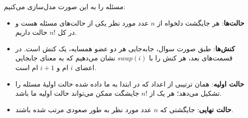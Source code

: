 \question{}
\begin{ابجد}
\item مسئله را به این صورت مدل‌سازی می‌کنیم:
\begin{itemize}
    \item \textbf{حالت‌ها}: هر جایگشت دلخواه از $n$ عدد مورد نظر یکی از حالت‌های مسئله هست و در کل $n!$ حالت داریم.
    \item \textbf{کنش‌ها}: طبق صورت سوال، جابه‌جایی هر دو عضو همسایه، یک کنش است. در قسمت‌های بعد، هر کنش را با $swap(i)$ نشان می‌دهیم که به معنای جابجایی اعضای $i$ ام و $i+1$ ام است.
    \item \textbf{حالت اولیه}: همان ترتیبی از اعداد که در ابتدا به ما داده شده حالت اولیۀ مسئله را تشکیل می‌دهد؛ هر یک از $n!$ جایشگت ممکن می‌تواند حالت اولیه ما باشد.
    \item \textbf{حالت نهایی}: جایگشتی که $n$ عدد مورد نظر به طور صعودی مرتب شده باشند.
\end{itemize}


\end{ابجد}
